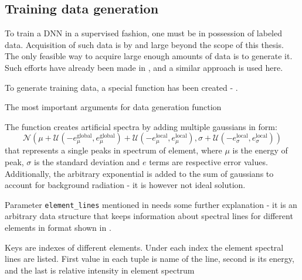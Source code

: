 \subsection{Training data generation}
To train a DNN in a supervised fashion, one must be in possession of labeled data. 
Acquisition of such data is by and large beyond the scope of this thesis. 
The only feasible way to acquire large enough amounts of data is to generate it. 
Such efforts have already been made in \cite{Alfeld2013}, and a similar approach is used here.

To generate training data, a special function has been created - . 

\newenvironment{longlistingD}{\captionsetup{type=listing, width=0.8\textwidth}}{}
\begin{longlistingD}
    \caption{The most important arguments for data generation function}
    \label{lst:data_generation}
\end{longlistingD}
\vspace{12pt}

The function creates artificial spectra by adding multiple gaussians in form: \[\mathcal{N}(\mu + \mathcal{U}(-e_\mu^{\text{global}}, e_\mu^{\text{global}}) + \mathcal{U}(-e_\mu^{\text{local}}, e_\mu^{\text{local}}), \sigma + \mathcal{U}(-e_\sigma^{\text{local}}, e_\sigma^{\text{local}}))\]
that represents a single peaks in spectrum of element, where $\mu$ is the energy of peak, $\sigma$ is the standard deviation and $e$ terms are respective error values. Additionally, the arbitrary exponential is added to the sum of gaussians to account for background radiation - it is however not ideal solution.

Parameter \texttt{element\_lines} mentioned in  needs some further explanation - it is an arbitrary data structure that keeps information about spectral lines for different elements in format shown in .

\newenvironment{longlistingE}{\captionsetup{type=listing, width=0.8\textwidth}}{}
\begin{longlistingE}
    \caption{Keys are indexes of different elements. Under each index the element spectral lines are listed. First value in each tuple is name of the line, second is its energy, and the last is relative intensity in element spectrum}
    \label{lst:element_lines}
\end{longlistingE}
\vspace{12pt}

